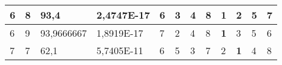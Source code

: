\documentclass[conference]{IEEEtran}
\begin{document}
\begin{table*}[]
\begin{tabular}{|llll|llllllll|}
\multicolumn{1}{|l|}{6}                                                     & \multicolumn{1}{l|}{8}                                                        & \multicolumn{1}{l|}{93,4}                                                         & 2,4747E-17                     & \multicolumn{1}{l|}{6}                                                  & \multicolumn{1}{l|}{3}                                                  & \multicolumn{1}{l|}{4}                                                  & \multicolumn{1}{l|}{8}                                                  & \multicolumn{1}{l|}{\textbf{1}}                                         & \multicolumn{1}{l|}{2}                                                  & \multicolumn{1}{l|}{5}                                                  & 7                          \\ \hline
\multicolumn{1}{|l|}{6}                                                     & \multicolumn{1}{l|}{9}                                                        & \multicolumn{1}{l|}{93,9666667}                                                   & 1,8919E-17                     & \multicolumn{1}{l|}{7}                                                  & \multicolumn{1}{l|}{2}                                                  & \multicolumn{1}{l|}{4}                                                  & \multicolumn{1}{l|}{8}                                                  & \multicolumn{1}{l|}{\textbf{1}}                                         & \multicolumn{1}{l|}{3}                                                  & \multicolumn{1}{l|}{5}                                                  & 6                          \\ \hline
\multicolumn{1}{|l|}{7}                                                     & \multicolumn{1}{l|}{7}                                                        & \multicolumn{1}{l|}{62,1}                                                         & 5,7405E-11                     & \multicolumn{1}{l|}{6}                                                  & \multicolumn{1}{l|}{5}                                                  & \multicolumn{1}{l|}{3}                                                  & \multicolumn{1}{l|}{7}                                                  & \multicolumn{1}{l|}{2}                                                  & \multicolumn{1}{l|}{\textbf{1}}                                         & \multicolumn{1}{l|}{4}                                                  & 8                          \\ \hline

\end{tabular}
\end{table*}
\end{document}
